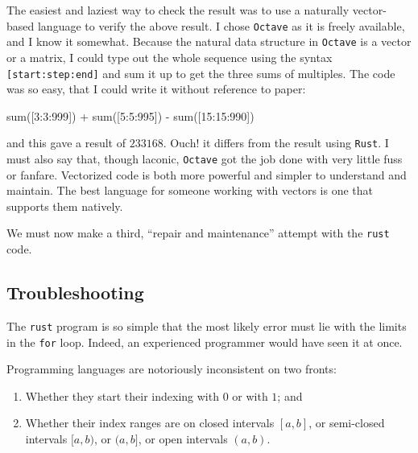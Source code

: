\documentclass[
  a4paper,
]{article}
\newenvironment{Shaded}{\begin{snugshade}}{\end{snugshade}}
\newcommand{\FloatTok}[1]{\textcolor[rgb]{0.75,0.75,0.82}{#1}}
\newcommand{\FunctionTok}[1]{\textcolor[rgb]{0.94,0.94,0.56}{#1}}
\newcommand{\NormalTok}[1]{\textcolor[rgb]{0.80,0.80,0.80}{#1}}
\newcommand{\OperatorTok}[1]{\textcolor[rgb]{0.94,0.94,0.82}{#1}}
\providecommand{\tightlist}{%
  \setlength{\itemsep}{0pt}\setlength{\parskip}{0pt}}
\begin{document}
The easiest and laziest way to check the result was to use a naturally
vector-based language to verify the above result. I chose
\texttt{Octave} as it is freely available, and I know it somewhat.
Because the natural data structure in \texttt{Octave} is a vector or a
matrix, I could type out the whole sequence using the syntax
\texttt{{[}start:step:end{]}} and sum it up to get the three sums of
multiples. The code was so easy, that I could write it without reference
to paper:

\begin{Shaded}
\begin{Highlighting}[]
\FunctionTok{sum}\NormalTok{([}\FloatTok{3}\OperatorTok{:}\FloatTok{3}\OperatorTok{:}\FloatTok{999}\NormalTok{]) }\OperatorTok{+} \FunctionTok{sum}\NormalTok{([}\FloatTok{5}\OperatorTok{:}\FloatTok{5}\OperatorTok{:}\FloatTok{995}\NormalTok{]) }\OperatorTok{{-}} \FunctionTok{sum}\NormalTok{([}\FloatTok{15}\OperatorTok{:}\FloatTok{15}\OperatorTok{:}\FloatTok{990}\NormalTok{])}
\end{Highlighting}
\end{Shaded}

and this gave a result of \(233168\). Ouch! it differs from the result
using \texttt{Rust}. I must also say that, though laconic,
\texttt{Octave} got the job done with very little fuss or fanfare.
Vectorized code is both more powerful and simpler to understand and
maintain. The best language for someone working with vectors is one that
supports them natively.

We must now make a third, ``repair and maintenance'' attempt with the
\texttt{rust} code.

\hypertarget{troubleshooting}{%
\subsection{Troubleshooting}\label{troubleshooting}}

The \texttt{rust} program is so simple that the most likely error must
lie with the limits in the \texttt{for} loop. Indeed, an experienced
programmer would have seen it at once.

Programming languages are notoriously inconsistent on two fronts:

\begin{enumerate}
\def\labelenumi{\alph{enumi}.}
\tightlist
\item
  Whether they start their indexing with \(0\) or with \(1\); and
\item
  Whether their index ranges are on closed intervals \([a, b]\), or
  semi-closed intervals \([a, b)\), or \((a, b]\), or open intervals
  \((a, b).\)
\end{enumerate}
\end{document}
